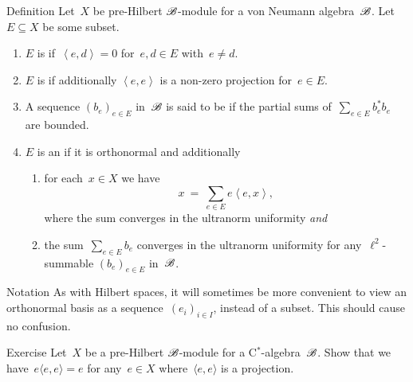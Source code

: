 \documentclass[b]{subfiles}
\begin{document}
\begin{parsec}%
\begin{point}{Definition}
    Let~$X$ be pre-Hilbert $\mathscr{B}$-module
        for a von Neumann algebra~$\mathscr{B}$.
    Let~$E \subseteq X$ be some subset.
    \begin{enumerate}
        \item $E$ is  if~$\left<e,d\right> = 0$
            for~$e,d \in E$ with~$e \neq d$.
        \item $E$ is  if additionally
                    $\left<e,e\right>$ is a non-zero projection
                    for~$e \in E$.
        \item A sequence $(b_e)_{e \in E}$ in~$\mathscr{B}$
                is said to be 
                if the partial sums of~$\sum_{e \in E} b_e^*b_e$
                are bounded.
        \item $E$ is an  if
                it is orthonormal and additionally
            \begin{enumerate}
                \item for each~$x \in X$ we have
                    \begin{equation*}
                        x \ =\  \sum_{e \in E} e\left<e,x\right>,
                    \end{equation*}
                    where the sum converges in the ultranorm uniformity
                    \emph{and}
                \item  the sum~$\sum_{e \in E} b_e$
                        converges in the ultranorm uniformity
                    for any~$\ell^2$-summable $(b_e)_{e \in E}$
                        in~$\mathscr{B}$.
            \end{enumerate}
    \end{enumerate}
\begin{point}{Notation}%
As with Hilbert spaces, it will sometimes be more convenient
    to view an orthonormal basis as a sequence~$(e_i)_{i \in I}$,
    instead of a subset. This should cause no confusion.
\end{point}
\end{point}
\begin{point}{Exercise}%
Let~$X$ be a pre-Hilbert $\mathscr{B}$-module for a C$^*$-algebra~$\mathscr{B}$.
Show that we have~$ e \langle e,e \rangle = e$
    for any~$e \in X$
   where~$\langle e, e\rangle$ is a projection.

\end{point}
\end{parsec}
\end{document}
